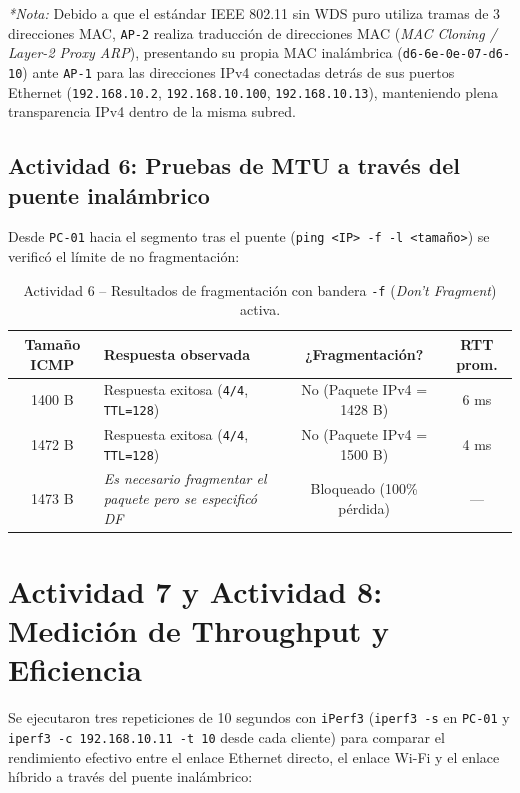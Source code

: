 \documentclass[11pt, a4paper]{article}
\begin{document}
\noindent \textit{*Nota:} Debido a que el estándar IEEE 802.11 sin WDS puro utiliza tramas de 3 direcciones MAC, \texttt{AP-2} realiza traducción de direcciones MAC (\textit{MAC Cloning / Layer-2 Proxy ARP}), presentando su propia MAC inalámbrica (\texttt{d6-6e-0e-07-d6-10}) ante \texttt{AP-1} para las direcciones IPv4 conectadas detrás de sus puertos Ethernet (\texttt{192.168.10.2}, \texttt{192.168.10.100}, \texttt{192.168.10.13}), manteniendo plena transparencia IPv4 dentro de la misma subred.

\subsection*{Actividad 6: Pruebas de MTU a través del puente inalámbrico}
Desde \texttt{PC-01} hacia el segmento tras el puente (\texttt{ping <IP> -f -l <tamaño>}) se verificó el límite de no fragmentación:

\begin{table}[h!]
\centering
\small
\setlength{\tabcolsep}{4.5pt}
\caption{Actividad 6 -- Resultados de fragmentación con bandera \texttt{-f} (\textit{Don't Fragment}) activa.}
\begin{tabularx}{\textwidth}{c >{\raggedright\arraybackslash}X c c}
\toprule
\textbf{Tamaño ICMP} & \textbf{Respuesta observada} & \textbf{¿Fragmentación?} & \textbf{RTT prom.} \\
\midrule
1400 B & Respuesta exitosa (\texttt{4/4}, \texttt{TTL=128}) & No (Paquete IPv4 = 1428 B) & 6 ms \\
1472 B & Respuesta exitosa (\texttt{4/4}, \texttt{TTL=128}) & No (Paquete IPv4 = 1500 B) & 4 ms \\
1473 B & \textit{Es necesario fragmentar el paquete pero se especificó DF} & Bloqueado (100\% pérdida) & --- \\
\bottomrule
\end{tabularx}
\end{table}

\section{Actividad 7 y Actividad 8: Medición de Throughput y Eficiencia}

Se ejecutaron tres repeticiones de 10 segundos con \texttt{iPerf3} (\texttt{iperf3 -s} en \texttt{PC-01} y \texttt{iperf3 -c 192.168.10.11 -t 10} desde cada cliente) para comparar el rendimiento efectivo entre el enlace Ethernet directo, el enlace Wi-Fi y el enlace híbrido a través del puente inalámbrico:
\end{document}
